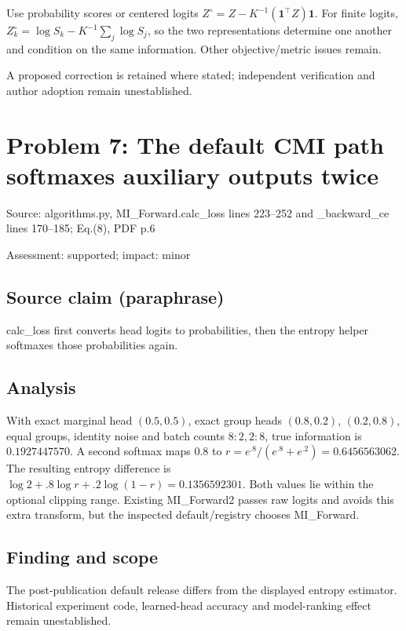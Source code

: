 \documentclass[11pt]{article}
\begin{document}
Use probability scores or centered logits \(Z^\circ=Z-K^{-1}(\mathbf1^\top Z)\mathbf1\). For finite logits, \(Z^\circ_k=\log S_k-K^{-1}\sum_j\log S_j\), so the two representations determine one another and condition on the same information. Other objective/metric issues remain.

A proposed correction is retained where stated; independent verification and author adoption remain unestablished.

\section*{Problem 7: The default CMI path softmaxes auxiliary outputs twice}

Source: algorithms.py, MI\_Forward.calc\_loss lines 223–252 and \_backward\_ce lines 170–185; Eq.(8), PDF p.6

Assessment: supported; impact: minor

\subsection*{Source claim (paraphrase)}

calc\_loss first converts head logits to probabilities, then the entropy helper softmaxes those probabilities again.

\subsection*{Analysis}

With exact marginal head \((0.5,0.5)\), exact group heads \((0.8,0.2)\), \((0.2,0.8)\), equal groups, identity noise and batch counts \(8:2,2:8\), true information is \(0.1927447570\). A second softmax maps \(0.8\) to \(r=e^{.8}/(e^{.8}+e^{.2})=0.6456563062\). The resulting entropy difference is \(\log2+.8\log r+.2\log(1-r)=0.1356592301\). Both values lie within the optional clipping range. Existing MI\_Forward2 passes raw logits and avoids this extra transform, but the inspected default/registry chooses MI\_Forward.

\subsection*{Finding and scope}

The post-publication default release differs from the displayed entropy estimator. Historical experiment code, learned-head accuracy and model-ranking effect remain unestablished.
\end{document}
